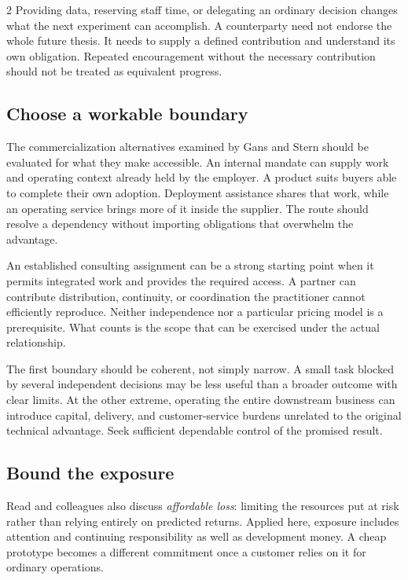 \begin{multicols}{2}
Providing data, reserving staff time, or delegating an ordinary decision
changes what the next experiment can accomplish. A counterparty need not
endorse the whole future thesis. It needs to supply a defined
contribution and understand its own obligation. Repeated encouragement
without the necessary contribution should not be treated as equivalent
progress.

\subsection{Choose a workable
boundary}\label{choose-a-workable-boundary}

The commercialization alternatives examined by Gans and Stern
\citep{gans2003commercialization} should be evaluated for what they make
accessible. An internal mandate can supply work and operating context
already held by the employer. A product suits buyers able to complete
their own adoption. Deployment assistance shares that work, while an
operating service brings more of it inside the supplier. The route
should resolve a dependency without importing obligations that overwhelm
the advantage.

An established consulting assignment can be a strong starting point when
it permits integrated work and provides the required access. A partner
can contribute distribution, continuity, or coordination the
practitioner cannot efficiently reproduce. Neither independence nor a
particular pricing model is a prerequisite. What counts is the scope
that can be exercised under the actual relationship.

The first boundary should be coherent, not simply narrow. A small task
blocked by several independent decisions may be less useful than a
broader outcome with clear limits. At the other extreme, operating the
entire downstream business can introduce capital, delivery, and
customer-service burdens unrelated to the original technical advantage.
Seek sufficient dependable control of the promised result.

\subsection{Bound the exposure}\label{bound-the-exposure}

Read and colleagues also discuss \emph{affordable loss}: limiting the
resources put at risk rather than relying entirely on predicted returns.
Applied here, exposure includes attention and continuing responsibility
as well as development money. A cheap prototype becomes a different
commitment once a customer relies on it for ordinary operations.


\end{multicols}
